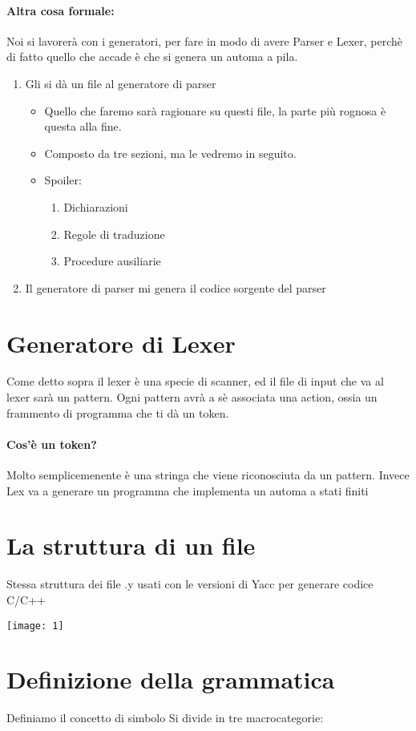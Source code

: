 \documentclass[12pt, a4paper, openany, twoside]{book}
\begin{document}
\paragraph{Altra cosa formale: }
Noi si lavorerà con i generatori, per fare in modo di avere Parser e Lexer, perchè
di fatto quello che accade è che si genera un automa a pila.
\begin{enumerate}
	\item Gli si dà un file al generatore di parser
	\begin{itemize}
		\item Quello che faremo sarà ragionare su questi file, la parte più 
		rognosa è questa alla fine.
		\item Composto da tre sezioni, ma le vedremo in seguito.
		\item Spoiler:
		\begin{enumerate}
			\item Dichiarazioni
			\item Regole di traduzione
			\item Procedure ausiliarie
		\end{enumerate}
	\end{itemize}
	\item Il generatore di parser mi genera il codice sorgente del parser
\end{enumerate}
\section{Generatore di Lexer}
Come detto sopra il lexer è una specie di scanner, ed il file di input che va 
al lexer sarà un pattern. Ogni pattern avrà a sè associata una action, ossia
un frammento di programma che ti dà un token. 
\paragraph{Cos'è un token? }Molto semplicemenente è una stringa che viene 
riconosciuta da un pattern.
Invece Lex va a generare un programma che implementa un automa a stati finiti
\section{La struttura di un file}
Stessa struttura dei file .y usati con le versioni di Yacc per generare codice
C/C++
\begin{center}
\texttt{[image: 1]}
\end{center}
\section{Definizione della grammatica}
Definiamo il concetto di simbolo
Si divide in tre macrocategorie:
\end{document}
